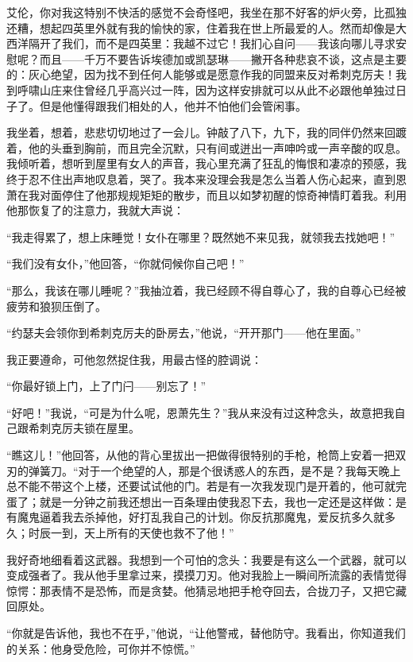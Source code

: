 {    \par 艾伦，你对我这特别不快活的感觉不会奇怪吧，我坐在那不好客的炉火旁，比孤独还糟，想起四英里外就有我的愉快的家，住着我在世上所最爱的人。然而却像是大西洋隔开了我们，而不是四英里：我越不过它！我扪心自问——我该向哪儿寻求安慰呢？而且——千万不要告诉埃德加或凯瑟琳——撇开各种悲哀不谈，这点是主要的：灰心绝望，因为找不到任何人能够或是愿意作我的同盟来反对希刺克厉夫！我到呼啸山庄来住曾经几乎高兴过一阵，因为这样安排就可以从此不必跟他单独过日子了。但是他懂得跟我们相处的人，他并不怕他们会管闲事。
    \par 我坐着，想着，悲悲切切地过了一会儿。钟敲了八下，九下，我的同伴仍然来回踱着，他的头垂到胸前，而且完全沉默，只有间或迸出一声呻吟或一声辛酸的叹息。我倾听着，想听到屋里有女人的声音，我心里充满了狂乱的悔恨和凄凉的预感，我终于忍不住出声地叹息着，哭了。我本来没理会我是怎么当着人伤心起来，直到恩萧在我对面停住了他那规规矩矩的散步，而且以如梦初醒的惊奇神情盯着我。利用他那恢复了的注意力，我就大声说：
    \par “我走得累了，想上床睡觉！女仆在哪里？既然她不来见我，就领我去找她吧！”
    \par “我们没有女仆，”他回答，“你就伺候你自己吧！”
    \par “那么，我该在哪儿睡呢？”我抽泣着，我已经顾不得自尊心了，我的自尊心已经被疲劳和狼狈压倒了。
    \par “约瑟夫会领你到希刺克厉夫的卧房去，”他说，“开开那门——他在里面。”
    \par 我正要遵命，可他忽然捉住我，用最古怪的腔调说：
    \par “你最好锁上门，上了门闩——别忘了！”
    \par “好吧！”我说，“可是为什么呢，恩萧先生？”我从来没有过这种念头，故意把我自己跟希刺克厉夫锁在屋里。
    \par “瞧这儿！”他回答，从他的背心里拔出一把做得很特别的手枪，枪筒上安着一把双刃的弹簧刀。“对于一个绝望的人，那是个很诱惑人的东西，是不是？我每天晚上总不能不带这个上楼，还要试试他的门。若是有一次我发现门是开着的，他可就完蛋了；就是一分钟之前我还想出一百条理由使我忍下去，我也一定还是这样做：是有魔鬼逼着我去杀掉他，好打乱我自己的计划。你反抗那魔鬼，爱反抗多久就多久；时辰一到，天上所有的天使也救不了他！”
    \par 我好奇地细看着这武器。我想到一个可怕的念头：我要是有这么一个武器，就可以变成强者了。我从他手里拿过来，摸摸刀刃。他对我脸上一瞬间所流露的表情觉得惊愕：那表情不是恐怖，而是贪婪。他猜忌地把手枪夺回去，合拢刀子，又把它藏回原处。
    \par “你就是告诉他，我也不在乎，”他说，“让他警戒，替他防守。我看出，你知道我们的关系：他身受危险，可你并不惊慌。”
}
